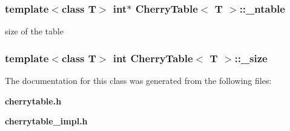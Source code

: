 \subsubsection{\setlength{\rightskip}{0pt plus 5cm}template$<$class T$>$ int$\ast$ {\bf Cherry\-Table}$<$ T $>$::{\bf \_\-ntable}\hspace{0.3cm}{\tt  [protected]}}\label{classCherryTable_p1}


size of the table 

\subsubsection{\setlength{\rightskip}{0pt plus 5cm}template$<$class T$>$ int {\bf Cherry\-Table}$<$ T $>$::{\bf \_\-size}\hspace{0.3cm}{\tt  [protected]}}\label{classCherryTable_p0}




The documentation for this class was generated from the following files:\begin{CompactItemize}
\item 
{\bf cherrytable.h}\item 
{\bf cherrytable\_\-impl.h}\end{CompactItemize}
